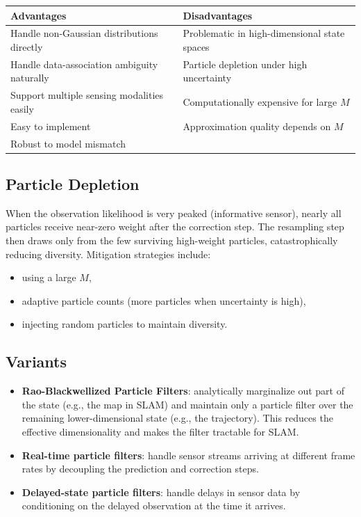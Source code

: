 \documentclass[11pt,a4paper]{article}
\theoremstyle{definition}
\theoremstyle{plain}
\theoremstyle{remark}
\begin{document}
\begin{center}
\begin{tabular}{ll}
\hline
\textbf{Advantages} & \textbf{Disadvantages} \\
\hline
Handle non-Gaussian distributions directly & Problematic in high-dimensional state spaces \\
Handle data-association ambiguity naturally & Particle depletion under high uncertainty \\
Support multiple sensing modalities easily & Computationally expensive for large $M$ \\
Easy to implement & Approximation quality depends on $M$ \\
Robust to model mismatch & \\
\hline
\end{tabular}
\end{center}

\subsection{Particle Depletion}

When the observation likelihood is very peaked (informative sensor), nearly all particles receive near-zero weight after the correction step. The resampling step then draws only from the few surviving high-weight particles, catastrophically reducing diversity. Mitigation strategies include:
\begin{itemize}
    \item using a large $M$,
    \item adaptive particle counts (more particles when uncertainty is high),
    \item injecting random particles to maintain diversity.
\end{itemize}

\subsection{Variants}

\begin{itemize}
    \item \textbf{Rao-Blackwellized Particle Filters}: analytically marginalize out part of the state (e.g., the map in SLAM) and maintain only a particle filter over the remaining lower-dimensional state (e.g., the trajectory). This reduces the effective dimensionality and makes the filter tractable for SLAM.
    \item \textbf{Real-time particle filters}: handle sensor streams arriving at different frame rates by decoupling the prediction and correction steps.
    \item \textbf{Delayed-state particle filters}: handle delays in sensor data by conditioning on the delayed observation at the time it arrives.
\end{itemize}
\end{document}
